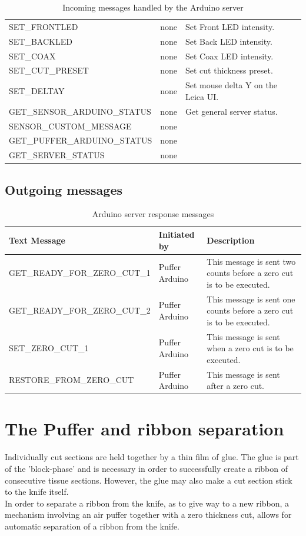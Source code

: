 \documentclass[11pt,fleqn]{book} %
\begin{document}
\begin{table}[h]
\begin{tabular}{l l  p{180pt}}
SET\_FRONTLED                   & none & Set Front LED intensity. \\  
SET\_BACKLED                    & none & Set Back LED intensity. \\  
SET\_COAX                       & none & Set Coax LED intensity. \\  
SET\_CUT\_PRESET                & none & Set cut thickness preset. \\  
SET\_DELTAY                     & none & Set mouse delta Y on the Leica UI. \\  
GET\_SENSOR\_ARDUINO\_STATUS       & none & Get general server status. \\  
SENSOR\_CUSTOM\_MESSAGE      		& none &  \\  
GET\_PUFFER\_ARDUINO\_STATUS       & none &  \\  
GET\_SERVER\_STATUS      			& none &  \\  

\bottomrule
\end{tabular}
\caption{Incoming messages handled by the Arduino server}\label{tab:ima}
\end{table}

\newpage

\subsection{Outgoing messages}
\begin{table}[h]
\centering
\begin{tabular}{l l p{160pt}}
\toprule
\textbf{Text Message} & \textbf{Initiated by} & \textbf{Description}\\
\midrule
GET\_READY\_FOR\_ZERO\_CUT\_1 	& Puffer Arduino & This message is sent two counts before a zero cut is to be executed. \\
GET\_READY\_FOR\_ZERO\_CUT\_2 	& Puffer Arduino & This message is sent one counts before a zero cut is to be executed. \\
SET\_ZERO\_CUT\_1 				& Puffer Arduino & This message is sent when a zero cut is to be executed. \\
RESTORE\_FROM\_ZERO\_CUT 		& Puffer Arduino & This message is sent after a zero cut. \\
\bottomrule
\end{tabular}
\caption{Arduino server response messages}\label{tab:asrm}
\end{table}


\newpage

\section{The Puffer and ribbon separation}
Individually cut sections are held together by a thin film of glue. The glue is part of the 'block-phase' and is necessary in order to successfully create a ribbon of consecutive tissue sections. However, the glue may also make a cut section stick to the knife itself.\\
In order to separate a ribbon from the knife, as to give way to a new ribbon, a mechanism involving an air puffer together with a zero thickness cut, allows for automatic separation of a ribbon from the knife.
\end{document}
